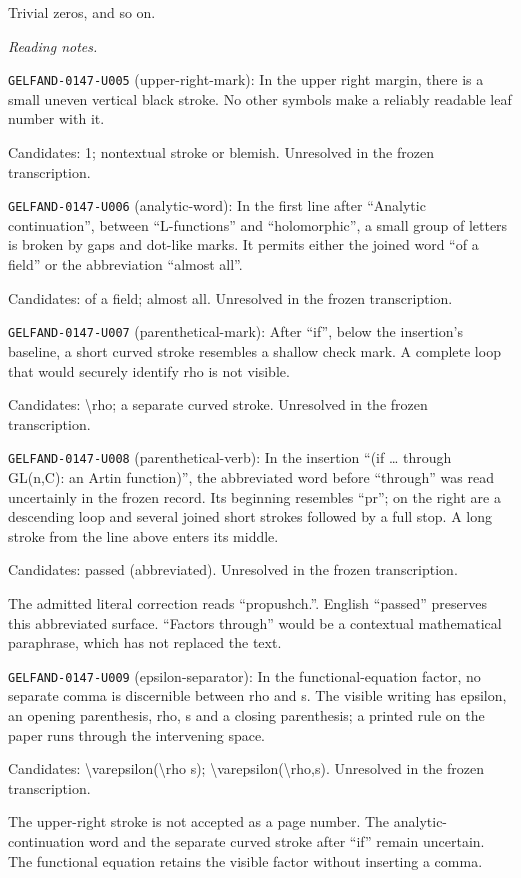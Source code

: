 Trivial zeros, and so on.


\par\smallskip\noindent\textit{Reading notes.}\par
\noindent\texttt{GELFAND-0147-U005} (upper-right-mark): In the upper right margin, there is a small uneven vertical black stroke. No other symbols make a reliably readable leaf number with it.\par
Candidates: 1; nontextual stroke or blemish. Unresolved in the frozen transcription.\par
\noindent\texttt{GELFAND-0147-U006} (analytic-word): In the first line after “Analytic continuation”, between “L-functions” and “holomorphic”, a small group of letters is broken by gaps and dot-like marks. It permits either the joined word “of a field” or the abbreviation “almost all”.\par
Candidates: of a field; almost all. Unresolved in the frozen transcription.\par
\noindent\texttt{GELFAND-0147-U007} (parenthetical-mark): After “if”, below the insertion’s baseline, a short curved stroke resembles a shallow check mark. A complete loop that would securely identify rho is not visible.\par
Candidates: \textbackslash{}rho; a separate curved stroke. Unresolved in the frozen transcription.\par
\noindent\texttt{GELFAND-0147-U008} (parenthetical-verb): In the insertion “(if … through GL(n,C): an Artin function)”, the abbreviated word before “through” was read uncertainly in the frozen record. Its beginning resembles “pr”; on the right are a descending loop and several joined short strokes followed by a full stop. A long stroke from the line above enters its middle.\par
Candidates: passed (abbreviated). Unresolved in the frozen transcription.\par
The admitted literal correction reads “propushch.”. English “passed” preserves this abbreviated surface. “Factors through” would be a contextual mathematical paraphrase, which has not replaced the text.\par
\noindent\texttt{GELFAND-0147-U009} (epsilon-separator): In the functional-equation factor, no separate comma is discernible between rho and s. The visible writing has epsilon, an opening parenthesis, rho, s and a closing parenthesis; a printed rule on the paper runs through the intervening space.\par
Candidates: \textbackslash{}varepsilon(\textbackslash{}rho s); \textbackslash{}varepsilon(\textbackslash{}rho,s). Unresolved in the frozen transcription.\par
The upper-right stroke is not accepted as a page number. The analytic-continuation word and the separate curved stroke after “if” remain uncertain. The functional equation retains the visible factor without inserting a comma.\par
